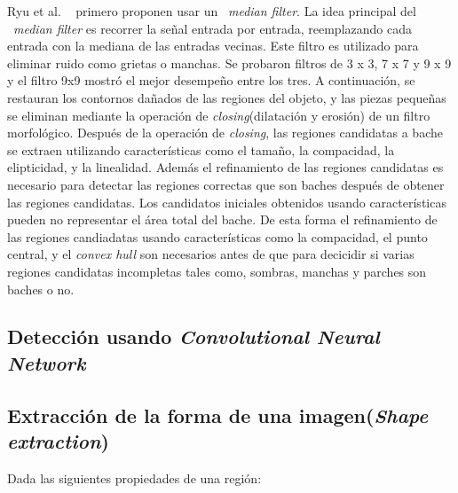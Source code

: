 Ryu et al. ~ primero proponen usar un ~\emph{median filter}. La idea principal del ~\emph{median filter} es recorrer la señal 
entrada por entrada, reemplazando cada entrada con la mediana de las entradas vecinas. Este filtro es utilizado para eliminar ruido como grietas o manchas. 
Se probaron filtros de 3 x 3, 7 x 7 y 9 x 9 y el filtro 9x9 mostró el mejor desempeño entre los tres. A continuación, se restauran los contornos dañados de las 
regiones del objeto, y las piezas pequeñas se eliminan mediante la operación de \emph{closing}(dilatación y erosión) de un filtro morfológico. Después de la operación 
de \emph{closing}, las regiones candidatas a bache se extraen utilizando características como el tamaño, la compacidad, la elipticidad,
y la linealidad. Además el refinamiento de las regiones candidatas es necesario para detectar las regiones correctas que son baches después de obtener las regiones 
candidatas. Los candidatos iniciales obtenidos usando características pueden no representar el área total del bache. De esta forma el refinamiento de las 
regiones candiadatas usando características como la compacidad, el punto central, y el \emph{convex hull} son necesarios antes de que para decicidir 
si varias regiones candidatas incompletas tales como, sombras, manchas y parches son baches o no.






\subsection{Detección usando \emph{Convolutional Neural Network}}

	\subsection{Extracción de la forma de una imagen(\emph{Shape extraction})}
	Dada las siguientes propiedades de una región:\\

